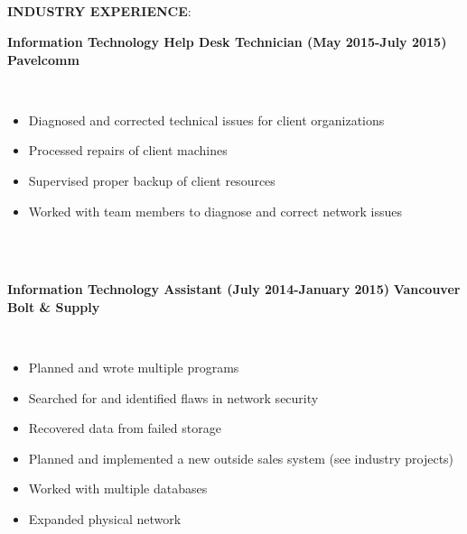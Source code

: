 \documentclass{article}
\begin{document}
\phantom \\
\phantom \\
%
%
%
%
\par
\phantom \\
\phantom \\
\noindent \textbf{INDUSTRY EXPERIENCE}:\\
\begin{vwcol}[widths={0.8,0.2}, sep=.8cm, justify=flush, rule=0pt, indent=0em]
\noindent \textbf{Information Technology Help Desk Technician (May 2015-July 2015)}
\newpage
\noindent \textbf{Pavelcomm}
\end{vwcol}
\phantom \\
\begin{itemize}
\item Diagnosed and corrected technical issues for client organizations
\item Processed repairs of client machines
\item Supervised proper backup of client resources
\item Worked with team members to diagnose and correct network issues
\end{itemize}
\phantom \\
\phantom \\
%
%
%
%
\begin{vwcol}[widths={0.8,0.2}, sep=.8cm, justify=flush, rule=0pt, indent=0em]
\noindent \textbf{Information Technology Assistant (July 2014-January 2015)}
\newpage
\noindent \textbf{Vancouver Bolt \& Supply}
\end{vwcol}
\phantom \\
\begin{itemize}
\item Planned and wrote multiple programs
\item Searched for and identified flaws in network security
\item Recovered data from failed storage
\item Planned and implemented a new outside sales system (see industry projects)
\item Worked with multiple databases
\item Expanded physical network
\end{itemize}
\end{document}

